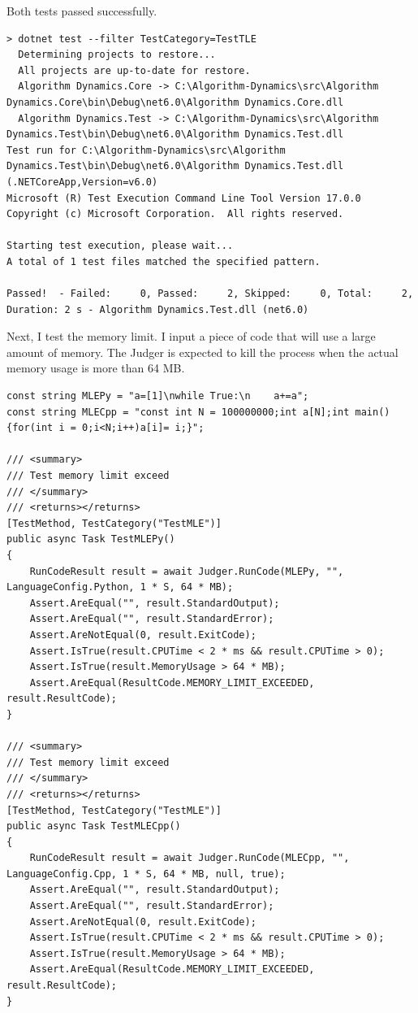 \documentclass[a4paper]{report}
\begin{document}
Both tests passed successfully.

\begin{verbatim}
> dotnet test --filter TestCategory=TestTLE
  Determining projects to restore...
  All projects are up-to-date for restore.
  Algorithm Dynamics.Core -> C:\Algorithm-Dynamics\src\Algorithm Dynamics.Core\bin\Debug\net6.0\Algorithm Dynamics.Core.dll
  Algorithm Dynamics.Test -> C:\Algorithm-Dynamics\src\Algorithm Dynamics.Test\bin\Debug\net6.0\Algorithm Dynamics.Test.dll
Test run for C:\Algorithm-Dynamics\src\Algorithm Dynamics.Test\bin\Debug\net6.0\Algorithm Dynamics.Test.dll (.NETCoreApp,Version=v6.0)
Microsoft (R) Test Execution Command Line Tool Version 17.0.0
Copyright (c) Microsoft Corporation.  All rights reserved.

Starting test execution, please wait...
A total of 1 test files matched the specified pattern.

Passed!  - Failed:     0, Passed:     2, Skipped:     0, Total:     2, Duration: 2 s - Algorithm Dynamics.Test.dll (net6.0)
\end{verbatim}

Next, I test the memory limit. I input a piece of code that will use a large amount of memory. The Judger is expected to kill the process when the actual memory usage is more than 64 MB.

\begin{verbatim}
const string MLEPy = "a=[1]\nwhile True:\n    a+=a";
const string MLECpp = "const int N = 100000000;int a[N];int main(){for(int i = 0;i<N;i++)a[i]= i;}";

/// <summary>
/// Test memory limit exceed
/// </summary>
/// <returns></returns>
[TestMethod, TestCategory("TestMLE")]
public async Task TestMLEPy()
{
    RunCodeResult result = await Judger.RunCode(MLEPy, "", LanguageConfig.Python, 1 * S, 64 * MB);
    Assert.AreEqual("", result.StandardOutput);
    Assert.AreEqual("", result.StandardError);
    Assert.AreNotEqual(0, result.ExitCode);
    Assert.IsTrue(result.CPUTime < 2 * ms && result.CPUTime > 0);
    Assert.IsTrue(result.MemoryUsage > 64 * MB);
    Assert.AreEqual(ResultCode.MEMORY_LIMIT_EXCEEDED, result.ResultCode);
}

/// <summary>
/// Test memory limit exceed
/// </summary>
/// <returns></returns>
[TestMethod, TestCategory("TestMLE")]
public async Task TestMLECpp()
{
    RunCodeResult result = await Judger.RunCode(MLECpp, "", LanguageConfig.Cpp, 1 * S, 64 * MB, null, true);
    Assert.AreEqual("", result.StandardOutput);
    Assert.AreEqual("", result.StandardError);
    Assert.AreNotEqual(0, result.ExitCode);
    Assert.IsTrue(result.CPUTime < 2 * ms && result.CPUTime > 0);
    Assert.IsTrue(result.MemoryUsage > 64 * MB);
    Assert.AreEqual(ResultCode.MEMORY_LIMIT_EXCEEDED, result.ResultCode);
}
\end{verbatim}
\end{document}
